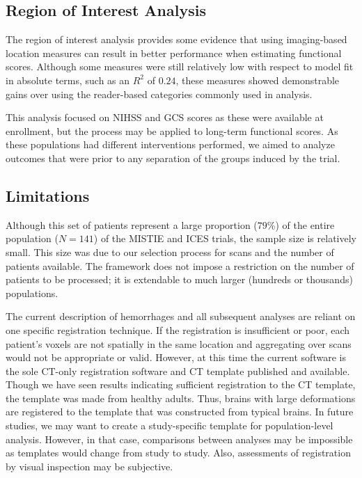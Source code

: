 \documentclass[10pt]{article}\usepackage[]{graphicx}\usepackage[]{color}
\begin{document}
\subsection{Region of Interest Analysis}

The region of interest analysis provides some evidence that using imaging-based location measures can result in better performance when estimating functional scores.  Although some measures were still relatively low with respect to model fit in absolute terms, such as an $R^2$ of $0.24$, these measures showed demonstrable gains over using the reader-based categories commonly used in analysis.

This analysis focused on NIHSS and GCS scores as these were available at enrollment, but the process may be applied to long-term functional scores.  As these populations had different interventions performed, we aimed to analyze outcomes that were prior to any separation of the groups induced by the trial.  

\subsection{Limitations}

Although this set of patients represent a large proportion ($79$\%) of the entire population ($N=141$) of the MISTIE and ICES trials, the sample size is relatively small.  This size was due to our selection process for scans and the number of patients available.  The framework does not impose a restriction on the number of patients to be processed; it is extendable to much larger (hundreds or thousands) populations.

The current description of hemorrhages and all subsequent analyses are reliant on one specific registration technique.  If the registration is insufficient or poor, each patient's voxels are not spatially in the same location and aggregating over scans would not be appropriate or valid.  However, at this time the current software is the sole CT-only registration software and CT template published and available.  Though we have seen results indicating sufficient registration to the CT template, the template was made from healthy adults.  Thus, brains with large deformations are registered to the template that was constructed from typical brains. In future studies, we may want to create a study-specific template for population-level analysis.  However, in that case, comparisons between analyses may be impossible as templates would change from study to study.  Also, assessments of registration by visual inspection may be subjective.
\end{document}
